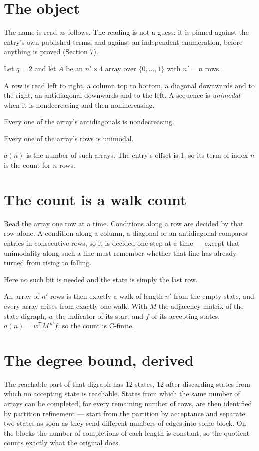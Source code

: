 \documentclass[11pt]{article}
\theoremstyle{definition}
\begin{document}
\section{The object}

The name is read as follows. The reading is not a guess: it is pinned against the entry's own published terms, and against an independent enumeration, before anything is proved (Section 7).

Let $q = 2$ and let $A$ be an $n' \times 4$ array over $\{0,\dots,1\}$ with $n' = n$ rows.

A row is read left to right, a column top to bottom, a diagonal downwards and to the right, an antidiagonal downwards and to the left. A sequence is {\itshape unimodal} when it is nondecreasing and then nonincreasing.

Every one of the array's antidiagonals is nondecreasing.

Every one of the array's rows is unimodal.

$a(n)$ is the number of such arrays. The entry's offset is 1, so its term of index $n$ is the count for $n$ rows.

\section{The count is a walk count}

Read the array one row at a time. Conditions along a row are decided by that row alone. A condition along a column, a diagonal or an antidiagonal compares entries in consecutive rows, so it is decided one step at a time --- except that unimodality along such a line must remember whether that line has already turned from rising to falling.

Here no such bit is needed and the state is simply the last row.

An array of $n'$ rows is then exactly a walk of length $n'$ from the empty state, and every array arises from exactly one walk. With $M$ the adjacency matrix of the state digraph, $w$ the indicator of its start and $f$ of its accepting states, $a(n) = w^{\mathsf T}M^{\,n'}f$, so the count is C-finite.

\section{The degree bound, derived}

The reachable part of that digraph has $12$ states, $12$ after discarding states from which no accepting state is reachable. States from which the same number of arrays can be completed, for every remaining number of rows, are then identified by partition refinement --- start from the partition by acceptance and separate two states as soon as they send different numbers of edges into some block. On the blocks the number of completions of each length is constant, so the quotient counts exactly what the original does.
\end{document}
